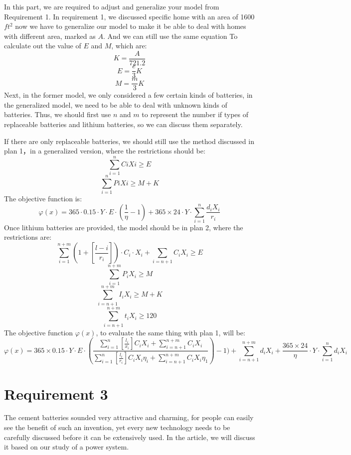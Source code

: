 \documentclass[UTF-8]{article}
\begin{document}
    In this part, we are required to adjust and generalize your model from Requirement 1. 
    In requirement 1, we discussed specific home with an area of 1600$ft^2$ now we have to generalize our  model to make it be able to deal with homes with different area, marked as $A$. And we can still use the same equation To
    calculate out the value of $E$ and $M$, which are:$$K=\frac{A}{721.2}$$ $$E=\frac{e}{3}K$$  $$M=\frac{m}{3}K$$
    Next, in the former model, we only considered a few certain kinds of batteries, in the generalized model, we need to be able to deal with unknown kinds of batteries. Thus, we should first use $n$ and $m$ to represent the 
    number if types of replaceable batteries and lithium batteries, so we can discuss them separately.\par
    If there are only replaceable batteries, we should still use the method discussed in plan 1，in a generalized version, where the restrictions should be:
    $$\sum_{i=1}^nCiXi\geq E$$
    $$\sum_{i=1}^nPiXi\geq M+K$$
    The objective function is:
    $$\varphi (x)=365 \cdot 0.15 \cdot Y \cdot E \cdot (\frac{1}{\eta }-1) +365\times 24\cdot Y \cdot \sum_{i=1} ^n\frac{d_iX_i}{r_i}$$ 
    Once lithium batteries are provided, the model should be in plan 2, where the restrictions are:
    $$\sum_{i=1}^{n+m}(1+[\frac{l-i}{r_i}]) \cdot C_i \cdot X_i + \sum_{i=n+1}C_iX_i\geq E$$
      $$\sum_{i=1}^{n+m}P_iX_i\geq M$$
    $$\sum_{i=n+1}^{n+m}I_iX_i\geq M+K$$
    $$\sum_{i=n+1}^{n+m} t_iX_i\geq 120$$
    The objective function $\varphi (x)$, to evaluate the same thing with plan 1,  will be:
    $$\varphi (x) = 365 \times 0.15 \cdot Y \cdot E \cdot (\frac{\sum^n_{i=1}[\frac{l_i}{x_i}]C_iX_i+\sum_{i=n+1}^{n+m}C_iX_i}{\sum^n_{i=1}[\frac{l_i}{r_i}]C_iX_i\eta _i+\sum_{i=n+1}^{n+m}C_iX_i\eta _1})-1)
    + \sum_{i=n+1} ^{n+m}d_iX_i+\frac{365 \times 24}{\eta } \cdot Y \cdot \sum_{i=1} ^{n}d_iX_i $$
    \section{Requirement 3}
    The cement batteries sounded very attractive and charming, for people can easily see the benefit of such an invention, yet every new technology needs to be carefully discussed  before it can be extensively used. In the article,
    we will discuss it based on our study of a power system.
\end{document}

